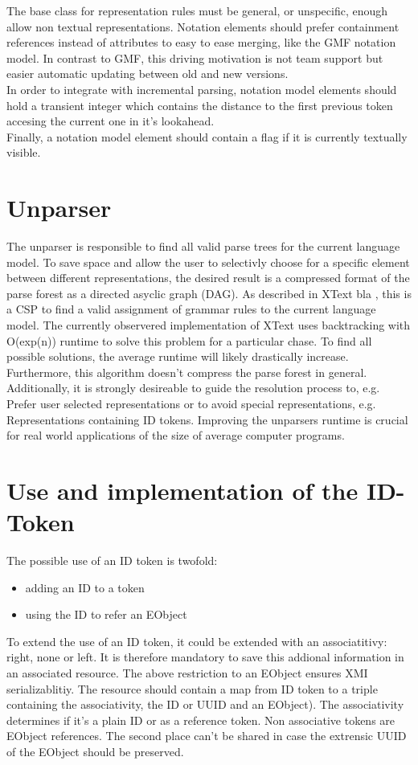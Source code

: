 The base class for representation rules must be general, or unspecific, enough allow non textual representations. Notation elements should prefer containment references instead of attributes to easy to ease merging, like the GMF notation model. In contrast to GMF, this driving motivation is not team support but easier automatic updating between old and new versions.\\
In order to integrate with incremental parsing, notation model elements should hold a transient integer which contains the distance to the first previous token accesing the current one in it's lookahead. \\
Finally, a notation model element should contain a flag if it is currently textually visible.

\section{Unparser}
The unparser is responsible to find all valid parse trees for the current language model. To save space and allow the user to selectivly choose for a specific element between different representations, the desired result is a compressed format of the parse forest as a directed asyclic graph (DAG).  As described in XText bla , this is a CSP to find a valid assignment of grammar rules to the current language model. The currently observered implementation of XText uses backtracking with O(exp(n)) runtime to solve this problem for a particular chase. To find all possible solutions, the average runtime will likely drastically increase. Furthermore, this algorithm doesn't compress the parse forest in general. Additionally, it is strongly desireable to guide the resolution process to, e.g. Prefer user selected representations or to avoid special representations, e.g. Representations containing ID tokens. Improving the unparsers runtime is crucial for real world applications of the size of average computer programs.

\section{Use and implementation of the ID-Token}
The possible use of an ID token is twofold:
\begin{itemize}
	\item adding an ID to a token
	\item using the ID to refer an EObject
\end{itemize}
To extend the use of an ID token, it could be extended with an associatitivy: right, none or left.
It is therefore mandatory to save this addional information in an associated resource. The above restriction to an EObject ensures XMI serializablitiy. The resource should contain a map from ID token to a triple containing the associativity, the ID or UUID and an EObject). The associativity determines if it's a plain ID or as a reference token. Non associative tokens are EObject references. The second place can't be shared in case the extrensic UUID of the EObject should be preserved.

